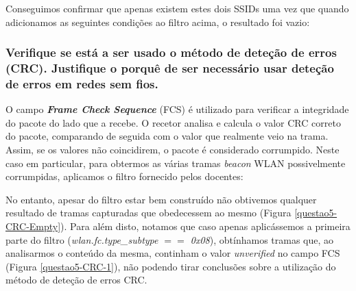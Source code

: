     \par Conseguimos confirmar que apenas existem estes dois SSIDs uma vez que quando adicionamos as seguintes condições ao filtro acima, o resultado foi vazio: 
    
    \vspace{5pt}
    \begin{minipage}{\linewidth}
    \centering
    \end{minipage}







\subsubsection{Verifique se está a ser usado o método de deteção de erros (CRC). Justifique o porquê de ser necessário usar deteção de erros em redes sem fios.}
    
    \par O campo \textit{\textbf{Frame Check Sequence}} (FCS) é utilizado para verificar a integridade do pacote do lado que a recebe. O recetor analisa e calcula o valor CRC correto do pacote, comparando de seguida com o valor que realmente veio na trama. Assim, se os valores não coincidirem, o pacote é considerado corrumpido. Neste caso em particular, para obtermos as várias tramas \textit{beacon} WLAN possivelmente corrumpidas, aplicamos o filtro fornecido pelos docentes:
        
    \vspace{10pt}
    \begin{minipage}{\linewidth}
    \centering
    \end{minipage}
   
    \vspace{10pt}
    \par No entanto, apesar do filtro estar bem construído não obtivemos qualquer resultado de tramas capturadas que obedecessem ao mesmo (Figura \ref{questao5-CRC-Empty}). Para além disto, notamos que caso apenas aplicássemos a primeira parte do filtro (\textit{wlan.fc.type\_subtype $==$ 0x08}), obtínhamos tramas que, ao analisarmos o conteúdo da mesma, continham o valor \textit{unverified} no campo FCS (Figura \ref{questao5-CRC-1}), não podendo tirar conclusões sobre a utilização do método de deteção de erros CRC.
    
